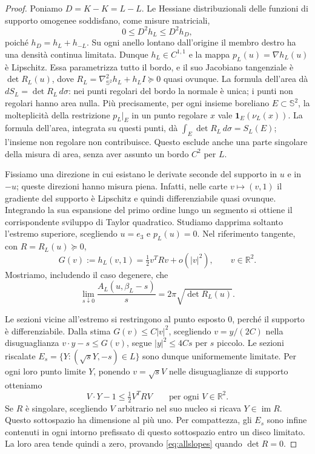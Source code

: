 \documentclass[11pt,a4paper]{article}
\theoremstyle{remark}
\newcommand{\R}{\mathbb R}
\newcommand{\Sph}{\mathbb S^2}
\newcommand{\ind}{\mathbf 1}
\begin{document}
\begin{proof}
Poniamo $D=K-K=L-L$. Le Hessiane distribuzionali delle funzioni di
supporto omogenee soddisfano, come misure matriciali,
\[
0\leq D^2h_L\leq D^2h_D,
\]
poiché $h_D=h_L+h_{-L}$. Su ogni anello lontano dall'origine il membro
destro ha una densità continua limitata. Dunque $h_L\in C^{1,1}$ e
la mappa $p_L(u)=\nabla h_L(u)$ è Lipschitz. Essa parametrizza tutto il
bordo, e il suo Jacobiano tangenziale è $\det R_L(u)$, dove
$R_L=\nabla_{\Sph}^2h_L+h_LI\succeq0$ quasi ovunque.
La formula dell'area dà $dS_L=\det R_L\,d\sigma$: nei punti regolari
del bordo la normale è unica; i punti non regolari hanno area nulla.
Più precisamente, per ogni insieme boreliano $E\subset\Sph$, la
molteplicità della restrizione $p_L|_E$ in un punto regolare $x$ vale
$\ind_E(\nu_L(x))$. La formula dell'area, integrata su questi punti,
dà $\int_E\det R_L\,d\sigma=S_L(E)$; l'insieme non regolare non
contribuisce. Questo esclude anche una parte singolare della misura
di area, senza aver assunto un bordo $C^2$ per $L$.

Fissiamo una direzione in cui esistano le derivate seconde del
supporto in $u$ e in $-u$; queste direzioni hanno misura piena.
Infatti, nelle carte $v\mapsto(v,1)$ il gradiente del supporto è
Lipschitz e quindi differenziabile quasi ovunque. Integrando la
sua espansione del primo ordine lungo un segmento si ottiene
il corrispondente sviluppo di Taylor quadratico.
Studiamo dapprima soltanto l'estremo superiore, scegliendo $u=e_3$
e $p_L(u)=0$. Nel riferimento tangente, con $R=R_L(u)\succeq0$,
\[
G(v):=h_L(v,1)=\tfrac12 v^T Rv+o(|v|^2),\qquad v\in\R^2.
\]
Mostriamo, includendo il caso degenere, che
\begin{equation}\label{eq:allslopes}
\lim_{s\downarrow0}\frac{A_L(u,\beta_L-s)}s
=2\pi\sqrt{\det R_L(u)}.
\end{equation}

Le sezioni vicine all'estremo si restringono al punto esposto $0$,
perché il supporto è differenziabile. Dalla stima
$G(v)\leq C|v|^2$, scegliendo $v=y/(2C)$ nella disuguaglianza
$v\cdot y-s\leq G(v)$, segue $|y|^2\leq4Cs$ per $s$ piccolo.
Le sezioni riscalate $E_s=\{Y:(\sqrt{s}Y,-s)\in L\}$ sono dunque
uniformemente limitate. Per ogni loro punto limite $Y$, ponendo
$v=\sqrt{s}V$ nelle disuguaglianze di supporto otteniamo
\[
V\cdot Y-1\leq\tfrac12 V^T RV\qquad\text{per ogni }V\in\R^2.
\]
Se $R$ è singolare, scegliendo $V$ arbitrario nel suo nucleo si
ricava $Y\in\operatorname{im}R$. Questo sottospazio ha dimensione
al più uno. Per compattezza, gli $E_s$ sono infine contenuti in ogni
intorno prefissato di questo sottospazio entro un disco limitato.
La loro area tende quindi a zero, provando \eqref{eq:allslopes}
quando $\det R=0$.


\end{proof}
\end{document}
